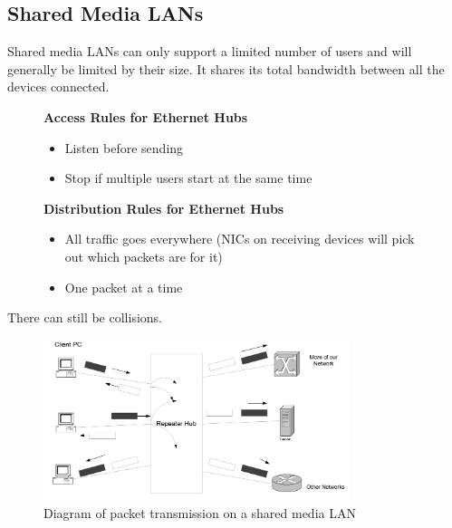 \subsection*{Shared Media LANs}
Shared media LANs can only support a limited number of users and will generally be limited by their size. It shares its total bandwidth between all the devices connected.
\begin{figure}[H]
    \begin{minipage}[t]{0.45\textwidth}
        \textbf{Access Rules for Ethernet Hubs}
        \begin{itemize}
            \item Listen before sending
            \item Stop if multiple users start at the same time
        \end{itemize}
    \end{minipage}\hfill
    \begin{minipage}[t]{0.45\textwidth}
        \textbf{Distribution Rules for Ethernet Hubs}
        \begin{itemize}
            \item All traffic goes everywhere (NICs on receiving devices will pick out which packets are for it)
            \item One packet at a time
        \end{itemize}
    \end{minipage}\hfill
\end{figure}
There can still be collisions.
\begin{figure}[H]
    \centering
    \includegraphics[width=0.8\textwidth]{assets/access-distro-shared-media-lans.png}
    \caption{Diagram of packet transmission on a shared media LAN}
\end{figure}
